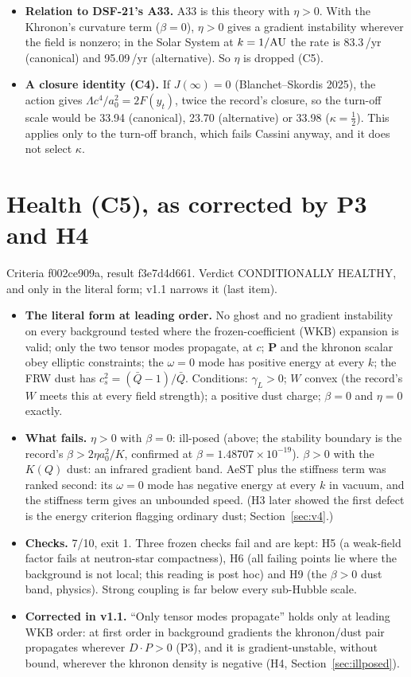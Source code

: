 \documentclass[10pt]{article}
\begin{document}
\begin{itemize}
\item \textbf{Relation to DSF-21's A33.} A33 is this theory with $\eta>0$. With the Khronon's curvature term ($\beta=0$), $\eta>0$ gives a gradient instability wherever the field is nonzero; in the Solar System at $k=1/{\rm AU}$ the rate is 83.3\,/yr (canonical) and 95.09\,/yr (alternative). So $\eta$ is dropped (C5).
\item \textbf{A closure identity (C4).} If $J(\infty)=0$ (Blanchet--Skordis 2025), the action gives $\Lambda c^4/a_0^2=2F(y_t)$, twice the record's closure, so the turn-off scale would be 33.94 (canonical), 23.70 (alternative) or 33.98 ($\kappa=\tfrac12$). This applies only to the turn-off branch, which fails Cassini anyway, and it does not select $\kappa$.
\end{itemize}

\section{Health (C5), as corrected by P3 and H4}
Criteria f002ce909a, result f3e7d4d661. Verdict CONDITIONALLY HEALTHY, and only in the literal form; v1.1 narrows it (last item).
\begin{itemize}
\item \textbf{The literal form at leading order.} No ghost and no gradient instability on every background tested where the frozen-coefficient (WKB) expansion is valid; only the two tensor modes propagate, at $c$; $\mathbf P$ and the khronon scalar obey elliptic constraints; the $\omega=0$ mode has positive energy at every $k$; the FRW dust has $c_s^2=(\bar Q-1)/\bar Q$. Conditions: $\gamma_L>0$; $W$ convex (the record's $W$ meets this at every field strength); a positive dust charge; $\beta=0$ and $\eta=0$ exactly.
\item \textbf{What fails.} $\eta>0$ with $\beta=0$: ill-posed (above; the stability boundary is the record's $\beta>2\eta a_0^2/K$, confirmed at $\beta=1.48707\times10^{-19}$). $\beta>0$ with the $K(Q)$ dust: an infrared gradient band. AeST plus the stiffness term was ranked second: its $\omega=0$ mode has negative energy at every $k$ in vacuum, and the stiffness term gives an unbounded speed. (H3 later showed the first defect is the energy criterion flagging ordinary dust; Section~\ref{sec:v4}.)
\item \textbf{Checks.} 7/10, exit 1. Three frozen checks fail and are kept: H5 (a weak-field factor fails at neutron-star compactness), H6 (all failing points lie where the background is not local; this reading is post hoc) and H9 (the $\beta>0$ dust band, physics). Strong coupling is far below every sub-Hubble scale.
\item \textbf{Corrected in v1.1.} ``Only tensor modes propagate'' holds only at leading WKB order: at first order in background gradients the khronon/dust pair propagates wherever $D\cdot P>0$ (P3), and it is gradient-unstable, without bound, wherever the khronon density is negative (H4, Section~\ref{sec:illposed}).
\end{itemize}
\end{document}

